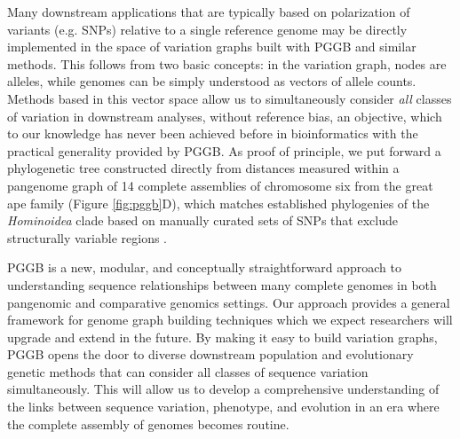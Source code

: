 \documentclass[pdflatex,mathphys]{jnl}%
\theoremstyle{thmstyleone}%
\theoremstyle{thmstyletwo}%
\theoremstyle{thmstylethree}%
\begin{document}
Many downstream applications that are typically based on polarization of variants (e.g. SNPs) relative to a single reference genome may be directly implemented in the space of variation graphs built with PGGB and similar methods. %
This follows from two basic concepts: in the variation graph, nodes are alleles, while genomes can be simply understood as vectors of allele counts.
Methods based in this vector space allow us to simultaneously consider \emph{all} classes of variation in downstream analyses, without reference bias, an objective, which to our knowledge has never been achieved before in bioinformatics with the practical generality provided by PGGB.
As proof of principle, we put forward a phylogenetic tree constructed directly from distances measured within a pangenome graph of 14 complete assemblies of chromosome six from the great ape family (Figure \ref{fig:pggb}D), which matches established phylogenies of the \textit{Hominoidea} clade based on manually curated sets of SNPs that exclude structurally variable regions \cite{Cagan_2016}.

PGGB is a new, modular, and conceptually straightforward approach to understanding sequence relationships between many complete genomes in both pangenomic and comparative genomics settings.
Our approach provides a general framework for genome graph building techniques which we expect researchers will upgrade and extend in the future.
By making it easy to build variation graphs, PGGB opens the door to diverse downstream population and evolutionary genetic methods that can consider all classes of sequence variation simultaneously.
This will allow us to develop a comprehensive understanding of the links between sequence variation, phenotype, and evolution in an era where the complete assembly of genomes becomes routine.



\end{document}
